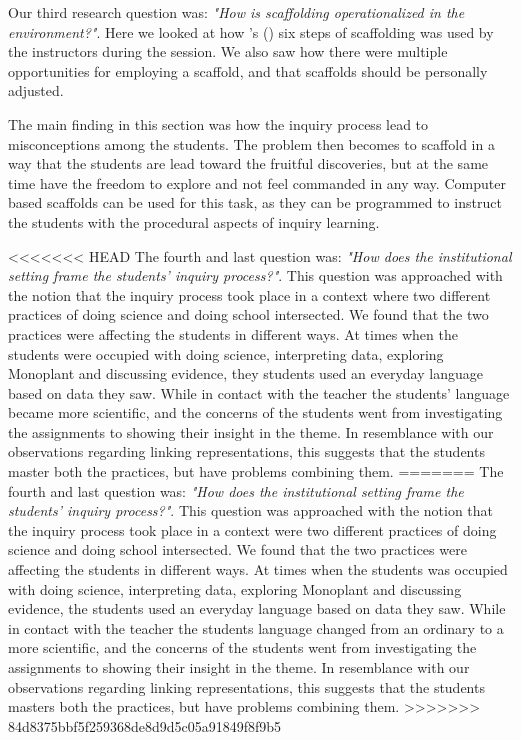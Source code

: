 
Our third research question was: \emph{"How is scaffolding operationalized in the environment?"}. Here we looked at how \citeauthor{wood1976role}'s (\citeyear{wood1976role}) six steps of scaffolding was used by the instructors during the session. We also saw how there were multiple opportunities for employing a scaffold, and that scaffolds should be personally adjusted. 

The main finding in this section was how the inquiry process lead to misconceptions among the students. The problem then becomes to scaffold in a way that the students are lead toward the fruitful discoveries, but at the same time have the freedom to explore and not feel commanded in any way. Computer based scaffolds can be used for this task, as they can be programmed to instruct the students with the procedural aspects of inquiry learning. 

<<<<<<< HEAD
The fourth and last question was: \emph{"How does the institutional setting frame the students' inquiry process?"}. This question was approached with the notion that the inquiry process took place in a context where two different practices of doing science and doing school intersected. We found that the two practices were affecting the students in different ways. At times when the students were occupied with doing science, interpreting data, exploring Monoplant and discussing evidence, they students used an everyday language based on data they saw. While in contact with the teacher the students' language became more scientific, and the concerns of the students went from investigating the assignments to showing their insight in the theme. In resemblance with our observations regarding linking representations, this suggests that the students master both the practices, but have problems combining them.
=======
The fourth and last question was: \emph{"How does the institutional setting frame the students' inquiry process?"}. This question was approached with the notion that the inquiry process took place in a context were two different practices of doing science and doing school intersected. We found that the two practices were affecting the students in different ways. At times when the students was occupied with doing science, interpreting data, exploring Monoplant and discussing evidence, the students used an everyday language based on data they saw. While in contact with the teacher the students language changed from an ordinary to a more scientific, and the concerns of the students went from investigating the assignments to showing their insight in the theme. In resemblance with our observations regarding linking representations, this suggests that the students masters both the practices, but have problems combining them.
>>>>>>> 84d8375bbf5f259368de8d9d5c05a91849f8f9b5
